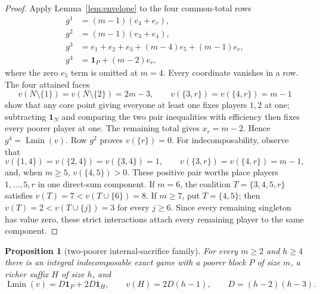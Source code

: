 \documentclass[11pt]{article}
\newtheorem{proposition}[theorem]{Proposition}
\newcommand{\Lmin}{\operatorname{Lmin}}
\newcommand{\one}{\mathbf 1}
\begin{document}
\begin{proof}
Apply Lemma~\ref{lem:envelope} to the four common-total rows
\begin{align*}
 g^1&=(m-1)(e_4+e_r),\\
 g^2&=(m-1)(e_3+e_4),\\
 g^3&=e_1+e_2+e_3+(m-4)e_5+(m-1)e_r,\\
 g^4&=\one_P+(m-2)e_r,
\end{align*}
where the zero $e_5$ term is omitted at $m=4$.
Every coordinate vanishes in a row.  The four attained faces
\[
 v(N\setminus\{1\})=v(N\setminus\{2\})=2m-3,\qquad
 v(\{3,r\})=v(\{4,r\})=m-1
\]
show that any core point giving everyone at least one fixes players $1,2$
at one; subtracting $\one_N$ and comparing the two pair inequalities with
efficiency then fixes every poorer player at one.  The remaining total gives
$x_r=m-2$.  Hence $g^4=\Lmin(v)$.  Row $g^2$ proves $v(\{r\})=0$.
For indecomposability, observe that
\[
 v(\{1,4\})=v(\{2,4\})=v(\{3,4\})=1,
 \qquad v(\{3,r\})=v(\{4,r\})=m-1,
\]
and, when $m\ge5$, $v(\{4,5\})>0$.  These positive pair worths place
players $1,\ldots,5,r$ in one direct-sum component.  If $m=6$, the coalition
$T=\{3,4,5,r\}$ satisfies $v(T)=7<v(T\cup\{6\})=8$.  If $m\ge7$, put
$T=\{4,5\}$; then $v(T)=2<v(T\cup\{j\})=3$ for every $j\ge6$.
Since every remaining singleton has value zero, these strict interactions
attach every remaining player to the same component.
\end{proof}

\begin{proposition}[two-poorer internal-sacrifice family]
\label{prop:family2}
For every $m\ge2$ and $h\ge4$ there is an integral indecomposable exact game
with a poorer block $P$ of size $m$, a richer suffix $H$ of size $h$, and
\[
 \Lmin(v)=D\one_P+2D\one_H,\qquad
 v(H)=2D(h-1),\qquad D=(h-2)(h-3).
\]
\end{proposition}
\end{document}
